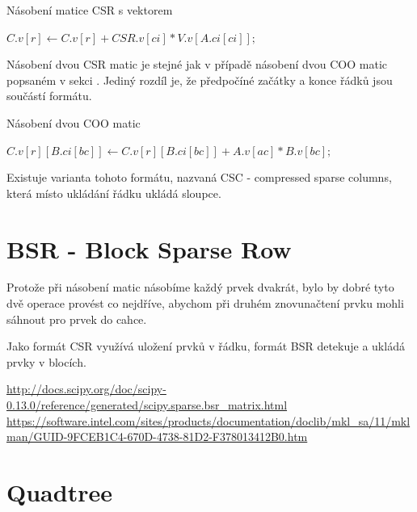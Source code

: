 \begin{algorithm}[H]
	\caption{Násobení matice CSR s vektorem}\label{csr-mvm}
	\begin{algorithmic}[1]
				\State \texttt{$C.v[r] \gets C.v[r] + CSR.v[ci] * V.v[A.ci[ci]];$}
			\EndFor
		\EndFor
		\EndProcedure
	\end{algorithmic}
\end{algorithm}

Násobení dvou CSR matic je stejné jak v případě násobení dvou COO matic popsaném v sekci . Jediný rozdíl je, že předpočíné začátky a konce řádků jsou součástí formátu.

\label{alg:csr-mmm}
\begin{algorithm}[H]
	\caption{Násobení dvou COO matic}\label{csr-mmm}
	\begin{algorithmic}[1]
					\State \texttt{$C.v[r][B.ci[bc]] \gets C.v[r][B.ci[bc]] + A.v[ac] * B.v[bc];$}
				\EndFor
			\EndFor
		\EndFor
		\EndProcedure
	\end{algorithmic}
\end{algorithm}

Existuje varianta tohoto formátu, nazvaná CSC - compressed sparse columns, která místo ukládání řádku ukládá sloupce.


\section{BSR - Block Sparse Row}

Protože při násobení matic násobíme každý prvek dvakrát, bylo by dobré tyto dvě operace provést co nejdříve, abychom při druhém znovunačtení prvku mohli sáhnout pro prvek do cahce.

Jako formát CSR využívá uložení prvků v řádku, formát BSR detekuje a ukládá prvky v blocích.




\url{http://docs.scipy.org/doc/scipy-0.13.0/reference/generated/scipy.sparse.bsr_matrix.html}
\url{https://software.intel.com/sites/products/documentation/doclib/mkl_sa/11/mklman/GUID-9FCEB1C4-670D-4738-81D2-F378013412B0.htm}



\section{Quadtree}

